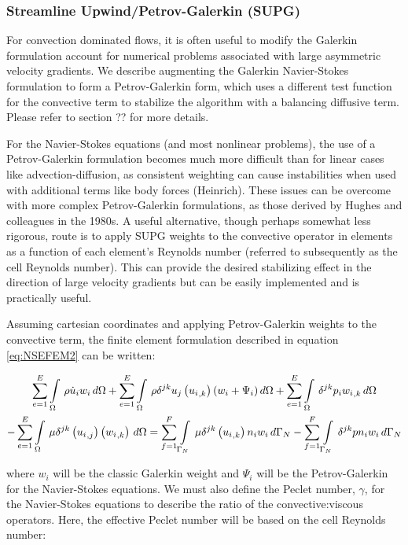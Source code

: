 \subsubsection{Streamline Upwind/Petrov-Galerkin (SUPG)}

For convection dominated flows, it is often useful to modify the Galerkin formulation account for numerical problems associated with large asymmetric  velocity gradients. We describe augmenting the Galerkin Navier-Stokes formulation to form a Petrov-Galerkin form, which uses a different test function for the convective term to stabilize the algorithm with a balancing diffusive term. Please refer to section ?? for more details. 

For the Navier-Stokes equations (and most nonlinear problems), the use of a Petrov-Galerkin formulation becomes much more difficult than for linear cases like advection-diffusion, as consistent weighting can cause instabilities when used with additional terms like body forces (Heinrich). These issues can be overcome with more complex Petrov-Galerkin formulations, as those derived by Hughes and colleagues in the 1980s. A useful alternative, though perhaps somewhat less rigorous, route is to apply SUPG weights to the convective operator in elements as a function of each element's Reynolds number (referred to subsequently as the cell Reynolds number). This can provide the desired stabilizing effect in the direction of large velocity gradients but can be easily implemented and is practically useful.    

 Assuming cartesian coordinates and applying Petrov-Galerkin weights to the convective term, the finite element formulation described in equation \eqref{eq:NSEFEM2} can be written:

\begin{multline}
 \label{NSEPGFEM1}
  \displaystyle\sum_{e=1}^{E}  \displaystyle\int\limits_{\Omega}^{} \,\rho\dot{u}_{i}w_{i}\,d\Omega 
 +\displaystyle\sum_{e=1}^{E}  \displaystyle\int\limits_{\Omega}^{} \,{\rho}{\delta}^{jk}{u_j}\left(  {u_{i}}_{,k}  \right)({w_{i}+\Psi_{i}})\,d\Omega 
 +\displaystyle\sum_{e=1}^{E}  \displaystyle\int\limits_{\Omega}^{} \,{\delta}^{jk}{p_{i}}{ {w_{i}}_{,k} }\,d\Omega \\
 -\displaystyle\sum_{e=1}^{E}  \displaystyle\int\limits_{\Omega}^{} \,{\mu}{\delta}^{jk}\left(  {u_{i}}_{,j}  \right)\left(  {w_{i}}_{,k}  \right)\,d\Omega =
 \displaystyle\sum_{f=1}^{F}  \displaystyle\int\limits_{\Gamma_N}^{} \,{\mu}{\delta}^{jk}\left(  {u_{i}}_{,k}  \right){n_{i}}{w_{i}}\,d\Gamma_N 
-\displaystyle\sum_{f=1}^{F}  \displaystyle\int\limits_{\Gamma_N}^{} \,{\delta}^{jk}{p}{n_i}{w_i}\,d\Gamma_N 
\end{multline}

where $w_i$ will be the classic Galerkin weight and $\Psi_i$ will be the Petrov-Galerkin for the Navier-Stokes equations. We must also define the Peclet number, $\gamma$, for the Navier-Stokes equations to describe the ratio of the convective:viscous operators. Here, the effective Peclet number will be based on the cell Reynolds number:

